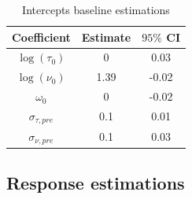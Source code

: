 \documentclass[11pt]{article}
\newcommand {\1}{\mathbb{1}}
\theoremstyle{definition}
\theoremstyle{remark}
\theoremstyle{remark}
\begin{document}
\begin{table}[H]
	\centering
	\begin{tabular}{|c|c|c|}
		\hline
		Coefficient   & Estimate  & $95\%$ CI \\
		\hline
		$\log(\tau_0)$   & 0     & 0.03 \\
		$\log(\nu_0)$  & 1.39  & -0.02 \\
		$\omega_0$     & 0     & -0.02 \\
		$\sigma_{\tau,pre}$   & 0.1   & 0.01  \\
		$\sigma_{\nu,pre}$    & 0.1   & 0.03  \\
		\hline
	\end{tabular}
	\caption{Intercepts baseline estimations}
	\label{table: baseline estilations}
\end{table}



\subsection{Response estimations}
\end{document}
